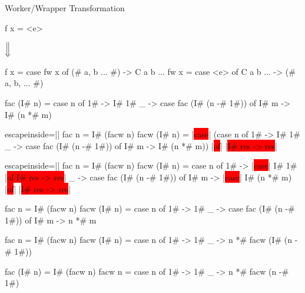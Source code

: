 \documentclass{haskellbeamer}
\begin{document}
\begin{frame}[fragile]{Worker/Wrapper Transformation}
  \begin{center}
    \begin{minipage}{0.7\textwidth}
      \begin{overprint}
        \begin{haskell}
          f x = <e>
        \end{haskell}
        \hspace{0.1\textwidth}$\Big\Downarrow$
        \begin{haskell}
          f x = case fw x of
            (# a, b ... #) -> C a b ...
          fw x = case <e> of
            C a b ... -> (# a, b, ... #)
        \end{haskell}
        \begin{haskell}
          fac (I# n) = case n of
            1# -> I# 1#
            _  -> case fac (I# (n -# 1#)) of
              I# m -> I# (n *# m)
        \end{haskell}
        \begin{haskell*}{escapeinside=||}
          fac n = I# (facw n)
          facw (I# n) = |\colorbox{red}{case}| (case n of
            1# -> I# 1#
            _  -> case fac (I# (n -# 1#)) of
              I# m -> I# (n *# m)) |\colorbox{red}{of}|
            |\colorbox{red}{I# res -> res}|
        \end{haskell*}
        \begin{haskell*}{escapeinside=||}
          fac n = I# (facw n)
          facw (I# n) = case n of
            1# -> |\colorbox{red}{case}| I# 1# |\colorbox{red}{of I# res -> res}|
            _  -> case fac (I# (n -# 1#)) of
              I# m ->  |\colorbox{red}{case}| I# (n *# m) |\colorbox{red}{of}|
                |\colorbox{red}{I# res -> res}|
        \end{haskell*}
        \begin{haskell}
          fac n = I# (facw n)
          facw (I# n) = case n of
            1# -> 1#
            _  -> case fac (I# (n -# 1#)) of
              I# m -> n *# m
        \end{haskell}
        \begin{haskell}
          fac n = I# (facw n)
          facw (I# n) = case n of
            1# -> 1#
            _  -> n *# facw (I# (n -# 1#))
        \end{haskell}
        \begin{haskell}
          fac (I# n) = I# (facw n)
          facw n = case n of
            1# -> 1#
            _  -> n *# facw (n -# 1#)
        \end{haskell}
      \end{overprint}
    \end{minipage}
  \end{center}
\end{frame}
\end{document}
